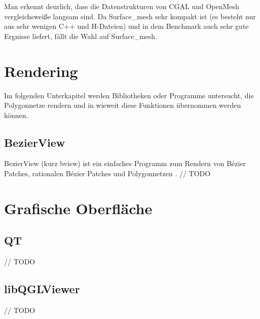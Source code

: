 Man erkennt deurlich, dass die Datenstrukturen von \acs{CGAL} und OpenMesh vergleichsweiße langsam sind.
Da Surface\_mesh sehr kompakt ist (es besteht nur aus sehr wenigen C++ und H-Dateien) und in dem Benchmark
auch sehr gute Ergnisse liefert, fällt die Wahl auf Surface\_mesh.


\section{Rendering}

Im folgenden Unterkapitel werden Bibliotheken oder Programme untersucht, die Polygonnetze rendern
und in wieweit diese Funktionen übernommen werden können. 

\subsection{BezierView}

BezierView (kurz bview) ist ein einfaches Programm zum Rendern von Bézier Patches, rationalen Bézier Patches und Polygonnetzen \cite{Peters.bview.27.07.2015}.
// TODO

\section{Grafische Oberfläche}

\subsection{QT}

// TODO

\subsection{libQGLViewer}

// TODO
